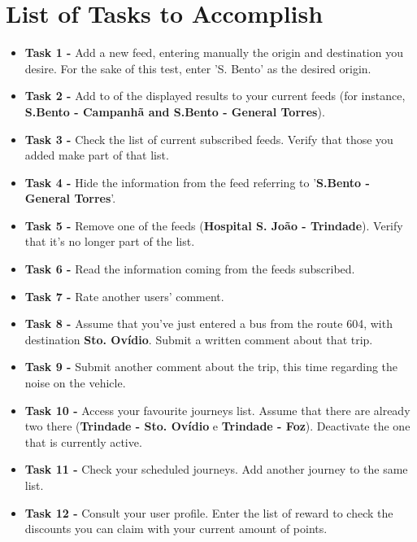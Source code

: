 \section{List of Tasks to Accomplish}
\begin{itemize}

\item \textbf{Task 1 -} Add a new feed, entering manually the origin and destination you desire. For the sake of this test, enter 'S. Bento' as the desired origin.

\item \textbf{Task 2 -} Add to of the displayed results to your current feeds (for instance, \textbf{S.Bento - Campanhã and S.Bento - General Torres}).

\item \textbf{Task 3 -} Check the list of current subscribed feeds. Verify that those you added make part of that list.

\item \textbf{Task 4 -} Hide the information from the feed referring to '\textbf{S.Bento - General Torres}'.

\item \textbf{Task 5 -} Remove one of the feeds (\textbf{Hospital S. João - Trindade}). Verify that it's no longer part of the list.

\item \textbf{Task 6 -} Read the information coming from the feeds subscribed.

\item \textbf{Task 7 -} Rate another users' comment.

\item \textbf{Task 8 -} Assume that you've just entered a bus from the route 604, with destination \textbf{Sto. Ovídio}. Submit a written comment about that trip.

\item \textbf{Task 9 -} Submit another comment about the trip, this time regarding the noise on the vehicle.

\item \textbf{Task 10 -} Access your favourite journeys list. Assume that there are already two there (\textbf{Trindade - Sto. Ovídio} e \textbf{Trindade - Foz}). Deactivate the one that is currently active.

\item \textbf{Task 11 -} Check your scheduled journeys. Add another journey to the same list.

\item \textbf{Task 12 -} Consult your user profile. Enter the list of reward to check the discounts you can claim with your current amount of points.
\end{itemize}


